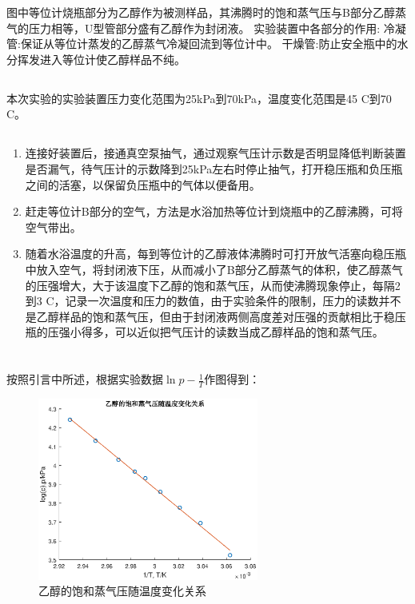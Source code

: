 \documentclass[10.5pt]{article}
\begin{document}
图中等位计烧瓶部分为乙醇作为被测样品，其沸腾时的饱和蒸气压与B部分乙醇蒸气的压力相等，U型管部分盛有乙醇作为封闭液。
实验装置中各部分的作用:\newline
冷凝管:保证从等位计蒸发的乙醇蒸气冷凝回流到等位计中。\newline
干燥管:防止安全瓶中的水分挥发进入等位计使乙醇样品不纯。
\subsection{\textbf{}}
本次实验的实验装置压力变化范围为25kPa到70kPa，温度变化范围是45 \degree C到70 \degree C。
\subsection{\textbf{}}
\begin{enumerate}
\item 连接好装置后，接通真空泵抽气，通过观察气压计示数是否明显降低判断装置是否漏气，待气压计的示数降到25kPa左右时停止抽气，打开稳压瓶和负压瓶之间的活塞，以保留负压瓶中的气体以便备用。
\item 赶走等位计B部分的空气，方法是水浴加热等位计到烧瓶中的乙醇沸腾，可将空气带出。
\item 随着水浴温度的升高，每到等位计的乙醇液体沸腾时可打开放气活塞向稳压瓶中放入空气，将封闭液下压，从而减小了B部分乙醇蒸气的体积，使乙醇蒸气的压强增大，大于该温度下乙醇的饱和蒸气压，从而使沸腾现象停止，每隔2到3 \degree C，记录一次温度和压力的数值，由于实验条件的限制，压力的读数并不是乙醇样品的饱和蒸气压，但由于封闭液两侧高度差对压强的贡献相比于稳压瓶的压强小得多，可以近似把气压计的读数当成乙醇样品的饱和蒸气压。
\end{enumerate}
\section{\textbf{}}
\subsection{\textbf{}}
按照引言中所述，根据实验数据$\ln p-\frac{1}{T}$作图得到：
\begin{figure}[!ht]
  \centering
  \caption{乙醇的饱和蒸气压随温度变化关系}
  \includegraphics[height=6cm]{figure2.eps}
\end{figure}
\end{document}
